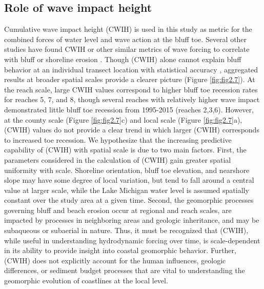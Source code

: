 \subsection{Role of wave impact height} 
\label{Role of wave impact height}

Cumulative wave impact height (CWIH) is used in this study as metric for the
combined forces of water level and wave action at the bluff toe. Several other
studies have found CWIH or other similar metrics of wave forcing to correlate
with bluff or shoreline erosion
\citep{ruggiero_wave_2001,brown_factors_2005,lin_field_2014}. Though (CWIH)
alone cannot explain bluff behavior at an individual transect location with
statistical accuracy \citep{swenson_bluff_2006}, aggregated results at broader
spatial scales provide a clearer picture (Figure \ref{fig:fig2.7}).  At the
reach scale, large CWIH values correspond to higher bluff toe recession rates
for reaches 5, 7, and 8, though several reaches with relatively higher wave
impact demonstrated little bluff toe recession from 1995-2015 (reaches 2,3,6).
However, at the county scale (Figure \ref{fig:fig2.7}c) and local scale (Figure
\ref{fig:fig2.7}a), (CWIH) values do not provide a clear trend in which larger
(CWIH) corresponds to increased toe recession.  We hypothesize that the
increasing predictive capability of (CWIH) with spatial scale is due to two main
factors. First, the parameters considered in the calculation of (CWIH) gain
greater spatial uniformity with scale. Shoreline orientation, bluff toe
elevation, and nearshore slope may have some degree of local variation, but tend
to fall around a central value at larger scale, while the Lake Michigan water
level is assumed spatially constant over the study area at a given time. Second,
the geomorphic processes governing bluff and beach erosion occur at regional and
reach scales, are impacted by processes in neighboring areas and geologic
inheritance, and may be subaqueous or subaerial in nature. Thus, it must be
recognized that (CWIH), while useful in understanding hydrodynamic forcing over
time, is scale-dependent in its ability to provide insight into coastal
geomorphic behavior. Further, (CWIH) does not explicitly account for the human
influences, geologic differences, or sediment budget processes that are vital to
understanding the geomorphic evolution of coastlines at the local level.  

